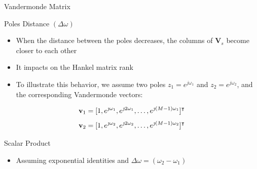 \documentclass{beamer}
\begin{document}
    \begin{frame}{Vandermonde Matrix}
        
        \begin{block}{Poles Distance $(\Delta \omega)$ }
        	\begin{itemize}
        		\item When the distance between the poles decreases, the columns of ${\mathbf{V}}_s$ become closer to each other
        		\item It impacts on the Hankel matrix rank
            \end{itemize}
        \end{block}
        
        \begin{itemize}
            \item To illustrate this behavior, we assume two poles $z_1 = e^{j\omega_1}$ and $z_2 = e^{j\omega_2}$, and the corresponding Vandermonde vectors:
        \end{itemize}
        
        $$ {\bf{v}}_1 = [1, e^{\jmath \omega_{1}}, e^{\jmath 2 \omega_{1}}, \dots, e^{\jmath (M-1) \omega_{1}}]^\intercal$$ 
        $$ {\bf{v}}_2 = [1, e^{\jmath \omega_{2}}, e^{\jmath 2 \omega_{2}}, \dots, e^{\jmath (M-1) \omega_{2}}]^\intercal$$
        
        \begin{block}{Scalar Product}
    	    \begin{itemize}
    	        \item Assuming exponential identities and $\Delta \omega = (\omega_{2}-\omega_{1})$
    	    \end{itemize}
	    \end{block}
        
    \end{frame}
    
\end{document}
